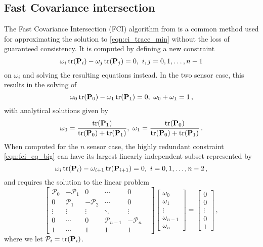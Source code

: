 \documentclass[letterpaper, 10 pt, conference]{ieeeconf}  %
\begin{document}
\subsection{Fast Covariance intersection}
The Fast Covariance Intersection (FCI) algorithm from \cite{niehsenInformationFusionBased2002} is a common method used for approximating the solution to \eqref{eqn:ci_trace_min} without the loss of guaranteed consistency. It is computed by defining a new constraint
\begin{equation}
   \omega_i \operatorname{tr}({{\mathbf{P}}}_i) - \omega_j \operatorname{tr}({{\mathbf{P}}}_j) = 0,\ i,j=0,1,\dots,n-1 \label{eqn:fci_eq_big}
\end{equation}
on $\omega_i$ and solving the resulting equations instead. In the two sensor case, this results in the solving of
\begin{equation}
   \omega_0 \operatorname{tr}({{\mathbf{P}}}_0) - \omega_1 \operatorname{tr}({{\mathbf{P}}}_1) = 0,\ \omega_0 + \omega_1 = 1\,, \label{eqn:fci_2sen_omega_sum_eq}
\end{equation}
with analytical solutions given by
\begin{equation}
   \omega_0 = \frac{\operatorname{tr}({{\mathbf{P}}}_1)}{\operatorname{tr}({{\mathbf{P}}}_0)+\operatorname{tr}({{\mathbf{P}}}_1)},\ \omega_1 = \frac{\operatorname{tr}({{\mathbf{P}}}_0)}{\operatorname{tr}({{\mathbf{P}}}_0)+\operatorname{tr}({{\mathbf{P}}}_1)}\,. \label{eqn:fci_2sen_sol}
\end{equation}
When computed for the $n$ sensor case, the highly redundant constraint \eqref{eqn:fci_eq_big} can have its largest linearly independent subset represented by
\begin{equation}
   \omega_i \operatorname{tr}({{\mathbf{P}}}_i) - \omega_{i+1} \operatorname{tr}({{\mathbf{P}}}_{i+1}) = 0,\ i=0,1,\dots,n-2\,, \label{eqn:fci_eq}
\end{equation}
and requires the solution to the linear problem
\begin{equation}
   \begin{bmatrix}
      \mathcal{P}_0 & -\mathcal{P}_1 & 0 & \cdots & 0 \\
      0 & \mathcal{P}_1 & -\mathcal{P}_2 & \cdots & 0 \\
      \vdots & \vdots & \vdots & \ddots & \vdots & \\
      0 & \cdots & 0 & \mathcal{P}_{n-1} & -\mathcal{P}_n \\
      1 & \cdots & 1 & 1 & 1 &
   \end{bmatrix}
   \begin{bmatrix}
      \omega_0 \\
      \omega_1 \\
      \vdots \\
      \omega_{n-1} \\
      \omega_n
   \end{bmatrix}
   =
   \begin{bmatrix}
      0 \\
      0 \\
      \vdots \\
      0 \\
      1
   \end{bmatrix}\,, \label{eqn:fci_eq_sys}
\end{equation}
where we let $\mathcal{P}_i = \operatorname{tr}({{\mathbf{P}}}_i)$.
\end{document}
